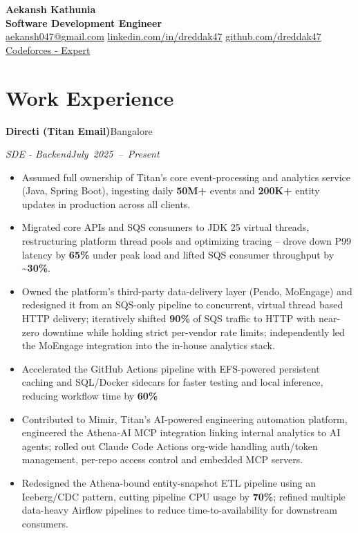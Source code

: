 \documentclass[10pt,letterpaper]{article}
\newcommand{\resumeHeading}[4]{%
  \par\noindent\textbf{#1}\hfill\mbox{#2}\par
  \noindent\textit{#3}\hfill\mbox{\textit{#4}}\par
}
\begin{document}
\begin{center}
  {\LARGE\bfseries Aekansh Kathunia}\\[-1pt]
  \textbf{Software Development Engineer}\\[1pt]

  \href{mailto:aekansh047@gmail.com}{aekansh047@gmail.com}
  \enspace\textbar\enspace \href{https://www.linkedin.com/in/dreddak47}{linkedin.com/in/dreddak47}
  \enspace\textbar\enspace
  \href{https://github.com/dreddak47}{github.com/dreddak47}
  \enspace\textbar\enspace
  \href{https://codeforces.com/profile/dredd_ak47}{Codeforces - Expert}
\end{center}
\vspace{-10pt}

\section{Work Experience}
\resumeHeading{Directi (Titan Email)}{Bangalore}{SDE - Backend}{July 2025 -- Present}
\begin{itemize}
\item Assumed full ownership of Titan's core event-processing and analytics service (Java, Spring Boot), ingesting daily \textbf{50M+} events and \textbf{200K+} entity updates in production across all clients.
\item Migrated core APIs and SQS consumers to JDK 25 virtual threads, restructuring platform thread pools and optimizing tracing -- drove down P99 latency by \textbf{65\%} under peak load and lifted SQS consumer throughput by \textbf{\textasciitilde 30\%}.
\item Owned the platform's third-party data-delivery layer (Pendo, MoEngage) and redesigned it from an SQS-only pipeline to concurrent, virtual thread based HTTP delivery; iteratively shifted \textbf{90\%} of SQS traffic to HTTP with near-zero downtime while holding strict per-vendor rate limits; independently led the MoEngage integration into the in-house analytics stack.
\item Accelerated the GitHub Actions pipeline with EFS-powered persistent caching and SQL/Docker sidecars for faster testing and local inference, reducing workflow time by \textbf{60\%}
\item Contributed to Mimir, Titan's AI-powered engineering automation platform, engineered the Athena-AI MCP integration linking internal analytics to AI agents; rolled out Claude Code Actions org-wide handling auth/token management, per-repo access control and embedded MCP servers.
\item Redesigned the Athena-bound entity-snapshot ETL pipeline using an Iceberg/CDC pattern, cutting pipeline CPU usage by \textbf{70\%}; refined multiple data-heavy Airflow pipelines to reduce time-to-availability for downstream consumers.
\end{itemize}
\end{document}
